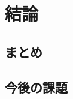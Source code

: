\documentclass[\homedir/main.tex]{subfiles}
\begin{document}
\setcounter{chapter}{5}
\chapter{結論}\label{chap:summary}

\section{まとめ}

\section{今後の課題}

\printBibForSubfiles
\end{document}

